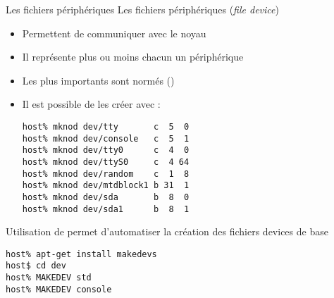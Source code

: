 \begin{frame}[fragile=singleslide]{Les fichiers périphériques}
  Les fichiers périphériques (\emph{file device})
  \begin{itemize}
  \item Permettent de communiquer avec le noyau
  \item Il représente plus ou moins chacun un périphérique
  \item       Les       plus        importants       sont       normés
    ()
  \item Il est possible de les créer avec :
    \begin{lstlisting}
host% mknod dev/tty       c  5  0
host% mknod dev/console   c  5  1
host% mknod dev/tty0      c  4  0
host% mknod dev/ttyS0     c  4 64
host% mknod dev/random    c  1  8
host% mknod dev/mtdblock1 b 31  1
host% mknod dev/sda       b  8  0
host% mknod dev/sda1      b  8  1
    \end{lstlisting}
  \end{itemize}
\end{frame}


\begin{frame}[fragile=singleslide]{Utilisation de }
   permet d'automatiser  la création des fichiers devices
  de base
  \begin{lstlisting}
host% apt-get install makedevs
host$ cd dev
host% MAKEDEV std
host% MAKEDEV console
  \end{lstlisting}
\end{frame}

